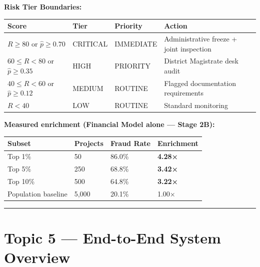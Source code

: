 \documentclass[11pt,a4paper]{article}
\begin{document}
\textbf{Risk Tier Boundaries:}

\begin{table}[htbp]
\centering
\small
\begin{tabularx}{\textwidth}{l l l Y}
\toprule
\textbf{Score} & \textbf{Tier} & \textbf{Priority} & \textbf{Action} \\
\midrule
$R \geq 80$ or $\hat{p} \geq 0.70$ & CRITICAL & IMMEDIATE & Administrative freeze + joint inspection \\
$60 \leq R < 80$ or $\hat{p} \geq 0.35$ & HIGH & PRIORITY & District Magistrate desk audit \\
$40 \leq R < 60$ or $\hat{p} \geq 0.12$ & MEDIUM & ROUTINE & Flagged documentation requirements \\
$R < 40$ & LOW & ROUTINE & Standard monitoring \\
\bottomrule
\end{tabularx}
\end{table}


\textbf{Measured enrichment (Financial Model alone --- Stage 2B):}

\begin{table}[htbp]
\centering
\small
\begin{tabularx}{\textwidth}{l l l Y}
\toprule
\textbf{Subset} & \textbf{Projects} & \textbf{Fraud Rate} & \textbf{Enrichment} \\
\midrule
Top 1\% & 50 & 86.0\% & \textbf{4.28×} \\
Top 5\% & 250 & 68.8\% & \textbf{3.42×} \\
Top 10\% & 500 & 64.8\% & \textbf{3.22×} \\
Population baseline & 5,000 & 20.1\% & 1.00× \\
\bottomrule
\end{tabularx}
\end{table}


\vspace{1em}\hrule\vspace{1em}

\section{Topic 5 --- End-to-End System Overview}
\end{document}
